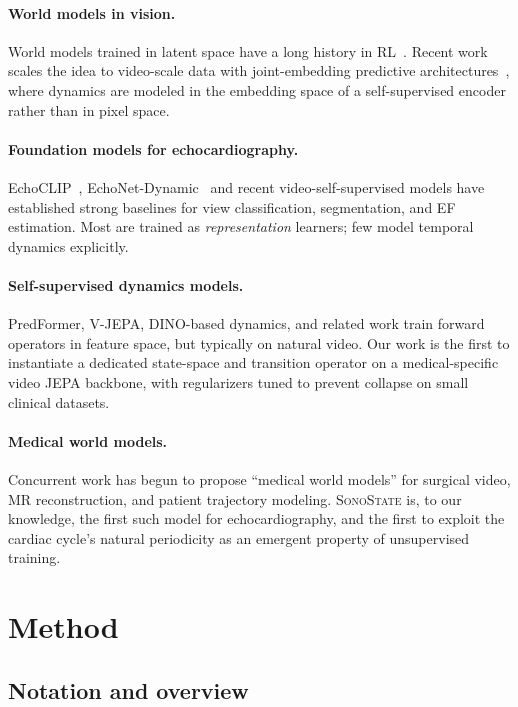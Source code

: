 \documentclass[runningheads]{llncs}
\newcommand{\sonostate}{\textsc{SonoState}\xspace}
\begin{document}
\paragraph{World models in vision.}
World models trained in latent space have a long history in
RL~\cite{ha2018world,hafner2019dreamer}. Recent work scales the idea to
video-scale data with joint-embedding predictive
architectures~\cite{vjepa,vjepa2}, where dynamics are modeled in the
embedding space of a self-supervised encoder rather than in pixel space.

\paragraph{Foundation models for echocardiography.}
EchoCLIP~\cite{echoclip}, EchoNet-Dynamic~\cite{echonet} and recent
video-self-supervised models have established strong baselines for
view classification, segmentation, and EF estimation. Most are trained as
\emph{representation} learners; few model temporal dynamics explicitly.

\paragraph{Self-supervised dynamics models.}
PredFormer, V-JEPA, DINO-based dynamics, and related work train forward
operators in feature space, but typically on natural video. Our work is the
first to instantiate a dedicated state-space and transition operator on a
medical-specific video JEPA backbone, with regularizers tuned to prevent
collapse on small clinical datasets.

\paragraph{Medical world models.}
Concurrent work has begun to propose ``medical world models'' for surgical
video, MR reconstruction, and patient trajectory modeling. \sonostate is, to
our knowledge, the first such model for echocardiography, and the first to
exploit the cardiac cycle's natural periodicity as an emergent property of
unsupervised training.

\section{Method}\label{sec:method}

\subsection{Notation and overview}
\end{document}

